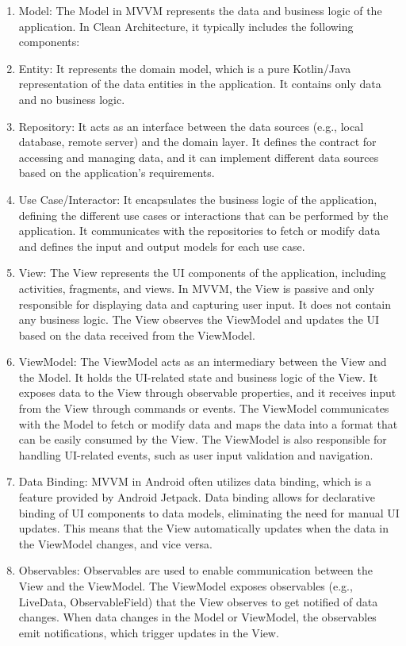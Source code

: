\documentclass[a4paper, 12pt]{article}
\begin{document}
\begin{enumerate}
    \item Model: The Model in MVVM represents the data and business logic of the application. In Clean Architecture, it typically includes the following components:
    \item Entity: It represents the domain model, which is a pure Kotlin/Java representation of the data entities in the application. It contains only data and no business logic.
    \item Repository: It acts as an interface between the data sources (e.g., local database, remote server) and the domain layer. It defines the contract for accessing and managing data, and it can implement different data sources based on the application's requirements.
    \item Use Case/Interactor: It encapsulates the business logic of the application, defining the different use cases or interactions that can be performed by the application. It communicates with the repositories to fetch or modify data and defines the input and output models for each use case.
    \item View: The View represents the UI components of the application, including activities, fragments, and views. In MVVM, the View is passive and only responsible for displaying data and capturing user input. It does not contain any business logic. The View observes the ViewModel and updates the UI based on the data received from the ViewModel.
    \item ViewModel: The ViewModel acts as an intermediary between the View and the Model. It holds the UI-related state and business logic of the View. It exposes data to the View through observable properties, and it receives input from the View through commands or events. The ViewModel communicates with the Model to fetch or modify data and maps the data into a format that can be easily consumed by the View. The ViewModel is also responsible for handling UI-related events, such as user input validation and navigation.
    \item Data Binding: MVVM in Android often utilizes data binding, which is a feature provided by Android Jetpack. Data binding allows for declarative binding of UI components to data models, eliminating the need for manual UI updates. This means that the View automatically updates when the data in the ViewModel changes, and vice versa.
    \item Observables: Observables are used to enable communication between the View and the ViewModel. The ViewModel exposes observables (e.g., LiveData, ObservableField) that the View observes to get notified of data changes. When data changes in the Model or ViewModel, the observables emit notifications, which trigger updates in the View.

\end{enumerate}
\end{document}
